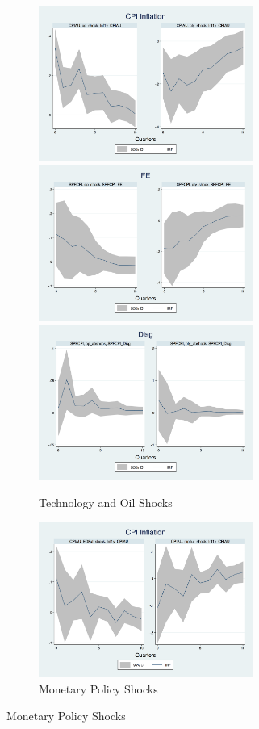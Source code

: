 \documentclass[12pt]{article}
\begin{document}
\begin{figure}[p]
	\begin{subfigure}[b]{0.5\textwidth}
		\centering
		\caption{Technology and Oil Shocks}
		\includegraphics[width=7cm]{figures/CPIAU_ashocks_nmp_before2007.png}  
		\smallskip
		\includegraphics[width=7cm]{figures/SPFFE_ashocks_nmp_before2007.png} 
		\smallskip
		\includegraphics[width=7cm]{figures/SPFDisg_ab_ashocks_nmp_before2007.png} 
	\end{subfigure}
	\hspace{1em}
	\hfill
	\begin{subfigure}[b]{0.5\textwidth}
		\caption{Monetary Policy Shocks}
		\includegraphics[width=7cm]{figures/CPIAU_ashocks_before2007.png} 

\end{subfigure}
\end{figure}
\end{document}
